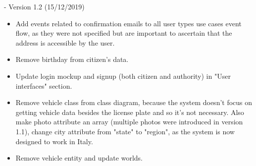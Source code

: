 - Version 1.2 (15/12/2019)
\begin{itemize}
	\item Add events related to confirmation emails to all user types use cases event flow, as they were not specified but are important to ascertain that the address is accessible by the user.
	\item Remove birthday from citizen's data.
	\item Update login mockup and signup (both citizen and authority) in "User interfaces" section.
	\item Remove vehicle class from class diagram, because the system doesn't focus on getting vehicle data besides the license plate and so it's not necessary. Also make photo attribute an array (multiple photos were introduced in version 1.1), change city attribute from "state" to "region", as the system is now designed to work in Italy.
	\item Remove vehicle entity and update worlds.
\end{itemize}
